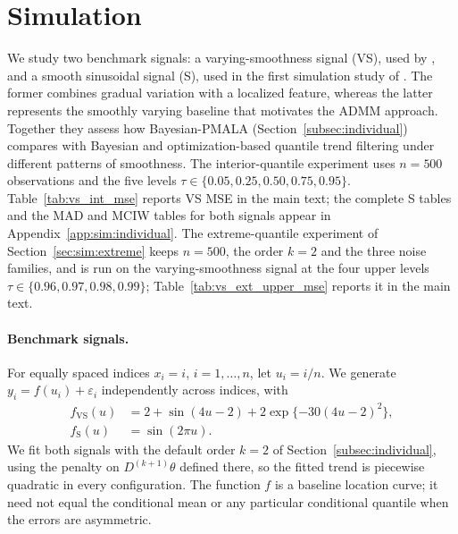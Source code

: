 \section{Simulation}
\label{sec:simulations}

We study two benchmark signals: a varying-smoothness signal (VS), used by \citet{onizuka2024fast}, and a smooth sinusoidal signal (S), used in the first simulation study of \citet{brantley2020baseline}. The former combines gradual variation with a localized feature, whereas the latter represents the smoothly varying baseline that motivates the ADMM approach. Together they assess how Bayesian-PMALA (Section~\ref{subsec:individual}) compares with Bayesian and optimization-based quantile trend filtering under different patterns of smoothness. The interior-quantile experiment uses $n=500$ observations and the five levels $\tau\in\{0.05,0.25,0.50,0.75,0.95\}$. Table~\ref{tab:vs_int_mse} reports VS MSE in the main text; the complete S tables and the MAD and MCIW tables for both signals appear in Appendix~\ref{app:sim:individual}. The extreme-quantile experiment of Section~\ref{sec:sim:extreme} keeps $n=500$, the order $k=2$ and the three noise families, and is run on the varying-smoothness signal at the four upper levels $\tau\in\{0.96,0.97,0.98,0.99\}$; Table~\ref{tab:vs_ext_upper_mse} reports it in the main text.

\paragraph{Benchmark signals.} For equally spaced indices $x_i=i$, $i=1,\ldots,n$, let $u_i=i/n$. We generate $y_i=f(u_i)+\varepsilon_i$ independently across indices, with
\begin{align}
 f_{\mathrm{VS}}(u)&=2+\sin(4u-2)+2\exp\{-30(4u-2)^2\},
 \label{eq:sim_vs}\\
 f_{\mathrm{S}}(u)&=\sin(2\pi u).
 \label{eq:sim_s}
\end{align}
We fit both signals with the default order $k=2$ of Section~\ref{subsec:individual}, using the penalty on $D^{(k+1)}\theta$ defined there, so the fitted trend is piecewise quadratic in every configuration. The function $f$ is a baseline location curve; it need not equal the conditional mean or any particular conditional quantile when the errors are asymmetric.

